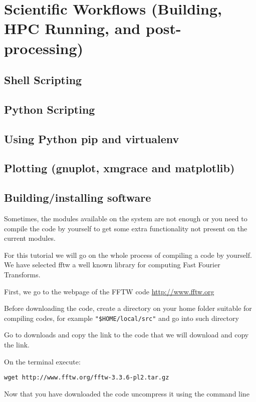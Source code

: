 \chapter{Scientific Workflows (Building, HPC Running, and post-processing)}

\section{Shell Scripting}

\section{Python Scripting}

\section{Using Python pip and virtualenv}

\section{Plotting (gnuplot, xmgrace and matplotlib)}

\section{Building/installing software}
Sometimes, the modules available on the system are not enough or you need to compile the code by yourself to get some extra functionality not present on the current modules. 

For this tutorial we will go on the whole process of compiling a code by yourself.
We have selected fftw a well known library for computing Fast Fourier Transforms. 

First, we go to the webpage of the FFTW code \url{http://www.fftw.org}

Before downloading the code, create a directory on your home folder suitable for compiling codes, for example \verb|"$HOME/local/src"| and go into such directory

Go to downloads and copy the link to the code that we will download and copy the link.

On the terminal execute:

\begin{lstlisting}
wget http://www.fftw.org/fftw-3.3.6-pl2.tar.gz
\end{lstlisting}

Now that you have downloaded the code uncompress it using the command line

